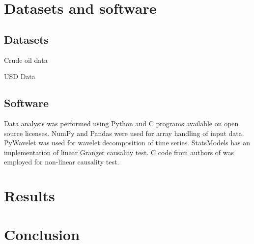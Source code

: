 \section{Datasets and software} \label{sec:data}

\subsection{Datasets}
Crude oil data \cite{crude-oil-data}

USD Data \cite{usd-data}

\subsection{Software}
Data analysis was performed using Python and C programs available on open source licenses.
NumPy \cite{numpy} and Pandas \cite{reback2020pandas} were used for array handling of input data.
PyWavelet \cite{pywavelet} was used for wavelet decomposition of time series.
StatsModels \cite{statsmodels} has an implementation of linear Granger causality test.
C code from authors of \cite{diks-panchenko2004} was employed for non-linear causality test.

\section{Results} \label{sec:results}
\section{Conclusion} \label{sec:conclusion}
